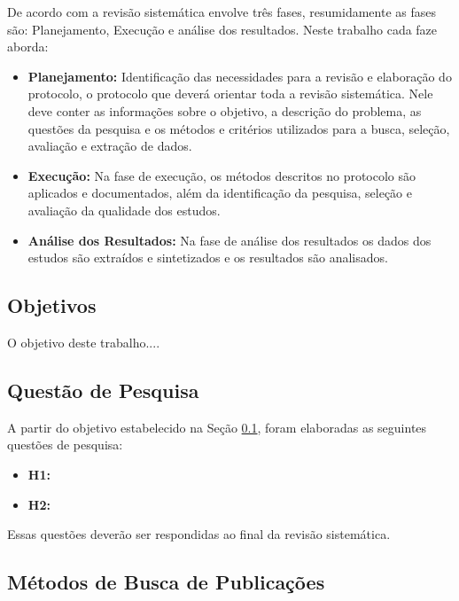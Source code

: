 \documentclass[12pt]{article}
\begin{document}
De acordo com \cite{brereton2007lessons} a revisão sistemática envolve três fases, resumidamente as fases são: Planejamento, Execução e análise dos resultados. Neste trabalho cada faze aborda:

 \begin{itemize}
   \item  \textbf{Planejamento: } Identificação  das  necessidades  para  a  revisão  e  elaboração do protocolo, o protocolo que deverá orientar toda a revisão sistemática. Nele deve conter as informações sobre o objetivo, a descrição do problema, as questões
da pesquisa e os métodos e critérios utilizados para a busca, seleção, avaliação e extração de dados.
   \item  \textbf{Execução: } Na fase de execução, os métodos descritos no protocolo são aplicados e documentados, além da identificação da pesquisa, seleção e avaliação da qualidade  dos  estudos.
      \item  \textbf{Análise dos Resultados: }Na fase de análise dos resultados os dados dos estudos são extraídos e sintetizados e os
resultados são analisados.
 \end{itemize}

\subsection{Objetivos} \label{sec3:subsec1}

O objetivo deste trabalho....

\subsection{Questão de Pesquisa} \label{sec3:subsec2}

A partir do objetivo estabelecido na Seção \ref{sec3:subsec1}, foram elaboradas as seguintes questões de pesquisa:

 \begin{itemize}
   \item  \textbf{H1: }
   \item  \textbf{H2: }
 \end{itemize}

Essas questões deverão ser respondidas ao final da revisão sistemática.

\subsection{Métodos de Busca de Publicações} \label{sec3:subsec3}
\end{document}
